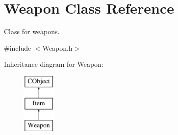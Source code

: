 \hypertarget{class_weapon}{}\section{Weapon Class Reference}
\label{class_weapon}


Class for weapons.  




{\ttfamily \#include $<$Weapon.\+h$>$}

Inheritance diagram for Weapon\+:\begin{figure}[H]
\begin{center}
\leavevmode
\includegraphics[height=3.000000cm]{class_weapon}
\end{center}
\end{figure}
